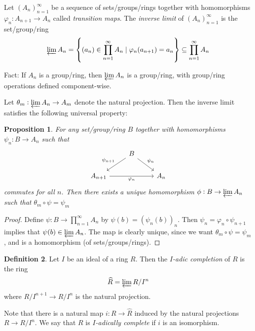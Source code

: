 \documentclass[12pt]{amsart}
\theoremstyle{definition}
\newtheorem{definition}{Definition}[section]
\theoremstyle{plain}
\newtheorem{proposition}[definition]{Proposition}
\theoremstyle{remark}
\begin{document}
Let $(A_n)_{n=1}^\infty$ be a sequence of sets/groups/rings together with homomorphisms $\varphi_n : A_{n+1} \to A_n$ called \emph{transition maps}. The \emph{inverse limit} of $(A_n)_{n=1}^\infty$ is the set/group/ring
\begin{equation*}
    \varprojlim A_n = \left\{(a_n) \in \prod_{n=1}^\infty A_n \mid \varphi_n(a_{n+1}) = a_n\right\} \subseteq \prod_{n=1}^\infty A_n
\end{equation*}

\noindent Fact: If $A_n$ is a group/ring, then $\varprojlim A_n$ is a group/ring, with group/ring operations defined component-wise.

Let $\theta_m : \varprojlim A_n \to A_m$ denote the natural projection. Then the inverse limit satisfies the following universal property:

\begin{proposition}\label{prop:3_3}
    For any set/group/ring $B$ together with homomorphisms $\psi_n : B \to A_n$ such that
    \begin{equation*}
    \begin{tikzcd}
        & B \arrow[ld, "\psi_{n+1}"'] \arrow[rd, "\psi_n"] &\\
        A_{n+1} \arrow[rr, "\varphi_n"'] & & A_n
    \end{tikzcd}
    \end{equation*}
    commutes for all $n$. Then there exists a unique homomorphism $\phi : B \to \varprojlim A_n$ such that $\theta_m \circ \psi = \psi_m$
\end{proposition}
\begin{proof}
    Define $\psi : B \to \prod_{n=1}^\infty A_n$ by $\psi(b) = (\psi_n(b))_n$. Then $\psi_n = \varphi_n \circ \psi_{n+1}$ implies that $\psi(b) \in \varprojlim A_n$. The map is clearly unique, since we want $\theta_m \circ \psi = \psi_m$, and is a homomorphism (of sets/groups/rings).
\end{proof}

\begin{definition}
    Let $I$ be an ideal of a ring $R$. Then the \emph{$I$-adic completion} of $R$ is the ring
    \begin{equation*}
        \widehat{R} = \varprojlim R/I^n
    \end{equation*}
    where $R/I^{n+1} \to R/I^n$ is the natural projection.
\end{definition}

Note that there is a natural map $i : R \to \widehat{R}$ induced by the natural projections $R \to R/I^n$. We say that $R$ is \emph{$I$-adically complete} if $i$ is an isomorphism.
\end{document}
